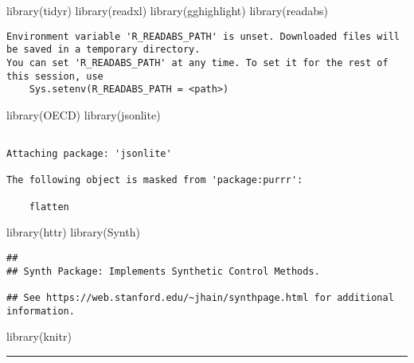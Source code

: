 \documentclass[
  letterpaper,
  DIV=11,
  numbers=noendperiod]{scrreprt}
\newenvironment{Shaded}{\begin{snugshade}}{\end{snugshade}}
\newcommand{\FunctionTok}[1]{\textcolor[rgb]{0.28,0.35,0.67}{#1}}
\newcommand{\NormalTok}[1]{\textcolor[rgb]{0.00,0.23,0.31}{#1}}
\begin{document}
\begin{Shaded}
\begin{Highlighting}[]
\FunctionTok{library}\NormalTok{(tidyr)}
\FunctionTok{library}\NormalTok{(readxl)}
\FunctionTok{library}\NormalTok{(gghighlight)}
\FunctionTok{library}\NormalTok{(readabs)}
\end{Highlighting}
\end{Shaded}

\begin{verbatim}
Environment variable 'R_READABS_PATH' is unset. Downloaded files will be saved in a temporary directory.
You can set 'R_READABS_PATH' at any time. To set it for the rest of this session, use
    Sys.setenv(R_READABS_PATH = <path>)
\end{verbatim}

\begin{Shaded}
\begin{Highlighting}[]
\FunctionTok{library}\NormalTok{(OECD)}
\FunctionTok{library}\NormalTok{(jsonlite)}
\end{Highlighting}
\end{Shaded}

\begin{verbatim}

Attaching package: 'jsonlite'

The following object is masked from 'package:purrr':

    flatten
\end{verbatim}

\begin{Shaded}
\begin{Highlighting}[]
\FunctionTok{library}\NormalTok{(httr)}
\FunctionTok{library}\NormalTok{(Synth)}
\end{Highlighting}
\end{Shaded}

\begin{verbatim}
##
## Synth Package: Implements Synthetic Control Methods.

## See https://web.stanford.edu/~jhain/synthpage.html for additional information.
\end{verbatim}

\begin{Shaded}
\begin{Highlighting}[]
\FunctionTok{library}\NormalTok{(knitr)}
\end{Highlighting}
\end{Shaded}

\begin{center}\rule{0.5\linewidth}{0.5pt}\end{center}
\end{document}

